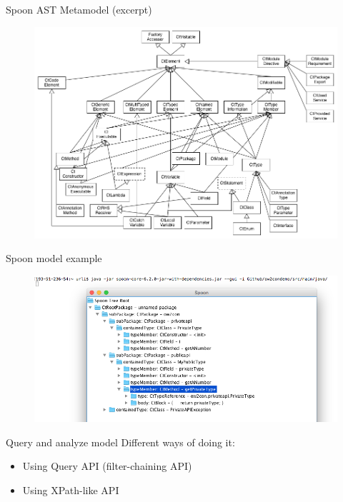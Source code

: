 \documentclass{beamer}
\begin{document}
\begin{frame}{Spoon AST Metamodel (excerpt)}
\begin{figure}
\centering
\includegraphics[width=\textwidth]{figures/model/structural-elements.png}
\end{figure}
\end{frame}

\begin{frame}{Spoon model example}
\begin{figure}
\centering
\includegraphics[width=\textwidth]{figures/model/spoon-model.png}
\end{figure}
\end{frame}

\begin{frame}{Query and analyze model}
Different ways of doing it:
\begin{itemize}
\item Using Query API (filter-chaining API)
\item Using XPath-like API
\end{itemize}
\end{frame}
\end{document}
